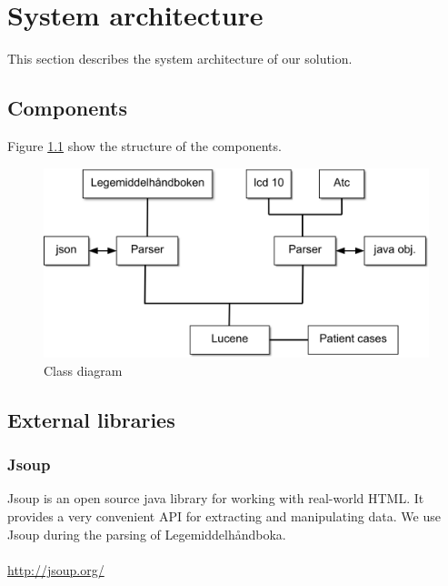 \chapter{System architecture}
\label{cha:architecture}

This section describes the system architecture of our solution.


\section{Components}
\label{sec:components}

Figure \ref{fig:class-diagram} show the structure of the components.

\begin{figure}
\begin{center}
	\includegraphics[width=\textwidth]{figures/class-diagram}
\end{center}
\caption{Class diagram}
\label{fig:class-diagram}
\end{figure}


\section{External libraries}
\label{sec:external-libraries}

\subsection*{Jsoup}
Jsoup is an open source java library for working with real-world HTML. It
provides a very convenient API for extracting and manipulating data. We use
Jsoup during the parsing of Legemiddelhåndboka.\\\\
\url{http://jsoup.org/}

